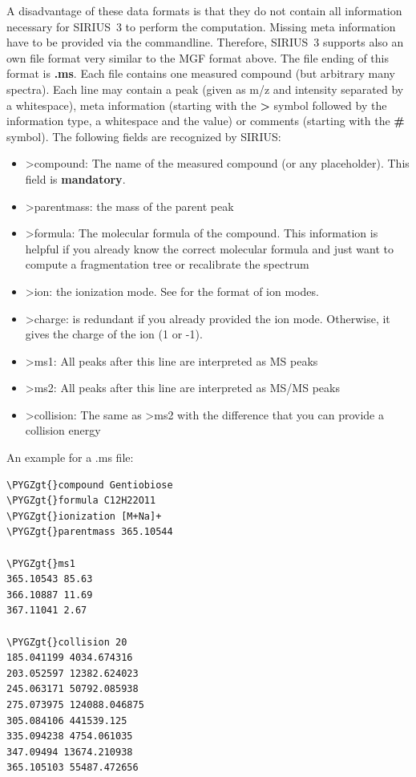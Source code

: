 \documentclass[letterpaper,10pt,openany,oneside]{sphinxmanual}
\def\PYGZgt{\char`\>}
\begin{document}
A disadvantage of these data formats is that they do not contain all information necessary for SIRIUS~3 to perform the computation. Missing meta information have to be provided via the commandline. Therefore, SIRIUS~3 supports also an own file format very similar to the MGF format above. The file ending of this format is \textbf{.ms}. Each file contains one measured compound (but arbitrary many spectra). Each line may contain a peak (given as m/z and intensity separated by a whitespace), meta information (starting with the \textbf{\textgreater{}} symbol followed by the information type, a whitespace and the value) or comments (starting with the \textbf{\#} symbol). The following fields are recognized by SIRIUS:
\begin{itemize}
\item {} 
\textgreater{}compound: The name of the measured compound (or any placeholder). This field is \textbf{mandatory}.

\item {} 
\textgreater{}parentmass: the mass of the parent peak

\item {} 
\textgreater{}formula: The molecular formula of the compound. This
information is helpful if you already know the correct molecular formula and
just want to compute a fragmentation tree or recalibrate the spectrum

\item {} 
\textgreater{}ion: the ionization mode. See {\hyperref[commandline:ions]{}} for the format of ion modes.

\item {} 
\textgreater{}charge: is redundant if you already provided the ion mode. Otherwise, it gives the charge of the ion (1 or -1).

\item {} 
\textgreater{}ms1: All peaks after this line are interpreted as MS peaks

\item {} 
\textgreater{}ms2: All peaks after this line are interpreted as MS/MS peaks

\item {} 
\textgreater{}collision: The same as \textgreater{}ms2 with the difference that you can provide a collision energy

\end{itemize}

An example for a .ms file:

\begin{Verbatim}[commandchars=\\\{\}]
\PYGZgt{}compound Gentiobiose
\PYGZgt{}formula C12H22O11
\PYGZgt{}ionization [M+Na]+
\PYGZgt{}parentmass 365.10544

\PYGZgt{}ms1
365.10543 85.63
366.10887 11.69
367.11041 2.67

\PYGZgt{}collision 20
185.041199 4034.674316
203.052597 12382.624023
245.063171 50792.085938
275.073975 124088.046875
305.084106 441539.125
335.094238 4754.061035
347.09494 13674.210938
365.105103 55487.472656
\end{Verbatim}
\end{document}
